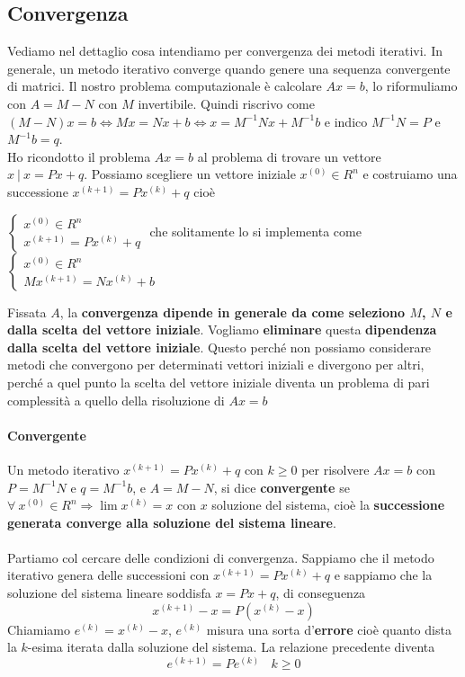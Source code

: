 \documentclass[10pt]{book}
\begin{document}
\subsection{Convergenza}
Vediamo nel dettaglio cosa intendiamo per convergenza dei metodi iterativi. In generale, un metodo iterativo converge quando genere una sequenza convergente di matrici. Il nostro problema computazionale è calcolare $Ax = b$, lo riformuliamo con $A = M - N$ con $M$ invertibile. Quindi riscrivo come $(M - N)x = b \Leftrightarrow Mx = Nx + b \Leftrightarrow x = M^{-1}N x + M^{-1}b$ e indico $M^{-1}N = P$ e $M^{-1}b = q$.\\
Ho ricondotto il problema $Ax = b$ al problema di trovare un vettore $x\:|\: x = Px + q$. Possiamo scegliere un vettore iniziale $x^{(0)} \in R^n$ e costruiamo una successione $x^{(k+1)} = Px^{(k)} + q$ cioè
\begin{list}{}{}
	\item $\left\{\begin{array}{l} x^{(0)} \in R^n\\x^{(k+1)} = Px^{(k)} + q \end{array}\right. $ che solitamente lo si implementa come $\left\{\begin{array}{l} x^{(0)} \in R^n\\Mx^{(k+1)} = Nx^{(k)} + b \end{array}\right. $ 
\end{list}
Fissata $A$, la \textbf{convergenza dipende in generale da come seleziono $M$, $N$ e dalla scelta del vettore iniziale}. Vogliamo \textbf{eliminare} questa \textbf{dipendenza dalla scelta del vettore iniziale}. Questo perché non possiamo considerare metodi che convergono per determinati vettori iniziali e divergono per altri, perché a quel punto la scelta del vettore iniziale diventa un problema di pari complessità a quello della risoluzione di $Ax = b$
\paragraph{Convergente} Un metodo iterativo $x^{(k+1)} = Px^{(k)} + q$ con $k \geq 0$ per risolvere $Ax = b$ con $P = M^{-1}N$ e $q = M^{-1}b$, e $A = M - N$, si dice \textbf{convergente} se $\forall\:x^{(0)}\in R^n \Rightarrow \lim x^{(k)} = x$ con $x$ soluzione del sistema, cioè la \textbf{successione generata converge alla soluzione del sistema lineare}.\\\\
Partiamo col cercare delle condizioni di convergenza. Sappiamo che il metodo iterativo genera delle successioni con $x^{(k+1)} = Px^{(k)} + q$ e sappiamo che la soluzione del sistema lineare soddisfa $x = Px + q$, di conseguenza
$$x^{(k+1)} - x = P(x^{(k)} - x)$$
Chiamiamo $e^{(k)} = x^{(k)} - x$, $e^{(k)}$ misura una sorta d'\textbf{errore} cioè quanto dista la $k$-esima iterata dalla soluzione del sistema. La relazione precedente diventa $$e^{(k + 1)} = Pe^{(k)}\:\:\:\: k\geq 0$$
\end{document}
